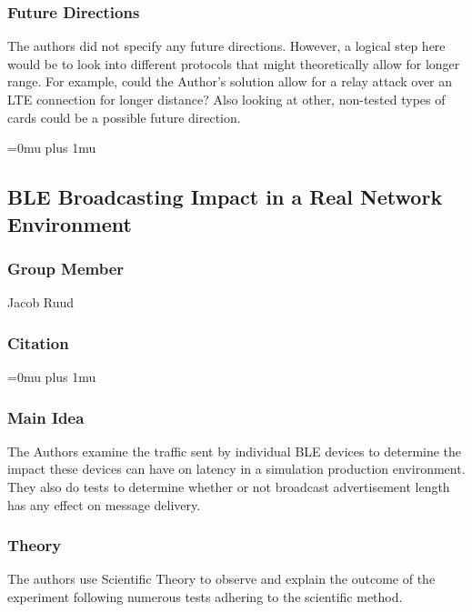 \subsubsection{Future Directions}

\noindent
The authors did not specify any future directions.  However, a logical step here would be to look into different protocols that might theoretically allow for longer range.  For example, could the Author's solution allow for a relay attack over an LTE connection for longer distance?  Also looking at other, non-tested types of cards could be a possible future direction.

\Urlmuskip=0mu plus 1mu\relax

\noindent
\subsection{{BLE} {B}roadcasting {I}mpact in a {R}eal {N}etwork {E}nvironment}

\subsubsection{Group Member}

\noindent
Jacob Ruud

\noindent
\subsubsection{Citation}

\Urlmuskip=0mu plus 1mu\relax

\subsubsection{Main Idea}

\noindent
The Authors examine the traffic sent by individual BLE devices to determine the impact these devices can have on latency in a simulation production environment. They also do tests to determine whether or not broadcast advertisement length has any effect on message delivery.

\subsubsection{Theory}

\noindent
The authors use Scientific Theory to observe and explain the outcome of the experiment following numerous tests adhering to the scientific method.

